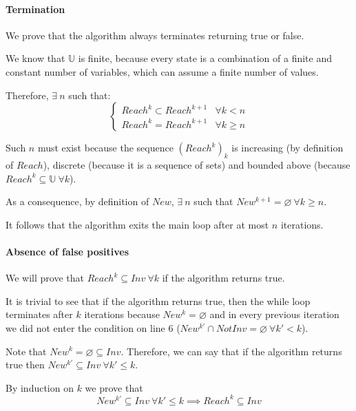 \documentclass[12pt]{article}
\begin{document}
    \paragraph{Termination}
    We prove that the algorithm always terminates returning true or false.
    
    We know that $\mathbb U$ is finite, because every state is a combination of a finite and constant number of variables, which can assume a finite number of values.

    Therefore, $\exists\ n$ such that:
    $$
    \begin{cases}
          Reach^k \subset Reach^{k+1} & \forall k < n \\
          Reach^k = Reach^{k+1} & \forall k \geq n
    \end{cases}
    $$

    Such $n$ must exist because the sequence $(Reach^k)_k$ is increasing (by definition of $Reach$), discrete (because it is a sequence of sets) and bounded above (because $Reach^k \subseteq \mathbb U\ \forall k$).

    As a consequence, by definition of $New$, $\exists\ n$ such that $New^{k+1} = \varnothing\ \forall k \geq n$.

    It follows that the algorithm exits the main loop after at most $n$ iterations.

    \paragraph{Absence of false positives}

    We will prove that $Reach^k \subseteq Inv\ \forall k$ if the algorithm returns true.

    It is trivial to see that if the algorithm returns true, then the while loop terminates after $k$ iterations because $New^k = \varnothing$ and in every previous iteration we did not enter the condition on line 6 ($New^{k'} \cap NotInv = \varnothing\ \forall k' < k$).

    Note that $New^k = \varnothing \subseteq Inv$.
    Therefore, we can say that if the algorithm returns true then $New^{k'} \subseteq Inv\ \forall k' \leq k$.

    By induction on $k$ we prove that
    \begin{equation}\label{th:true:tesi}
        New^{k'} \subseteq Inv\ \forall k' \leq k \implies Reach^k \subseteq Inv
    \end{equation}
    
\end{document}
